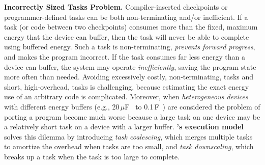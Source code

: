 \textbf{Incorrectly Sized Tasks Problem.} Compiler-inserted checkpoints or
programmer-defined tasks can be both non-terminating and/or
inefficient.  If a task (or code between two checkpoints) consumes more than the fixed,
maximum energy that the device can buffer, then the task
will never be able to complete using buffered energy.  Such a task is
non-terminating, {\em prevents forward progress}, and makes the program
incorrect. 
%
If the task consumes far less energy than a device can buffer, the system
may operate {\em inefficiently}, saving the program state more often than needed.
%
Avoiding excessively costly, non-terminating, tasks and short, high-overhead,
tasks is challenging, because estimating the exact energy use of an arbitrary code is complicated.  
Moreover, when \emph{heterogeneous devices} with different energy buffers (e.g., 20\,$\mu $F~\cite{rodriguez_tbcs_2015} to 0.1\,F~\cite{moo}) are considered the problem of porting a program become much worse
because a large task on one device may be a relatively short task
on a device with a larger buffer.
%
\textbf{\sys's execution model} solves this dilemma by introducing {\em task coalescing}, which
merges multiple tasks to amortize the overhead when tasks are too small, and
{\em task downscaling}, which breaks up a task when the task is too large to complete. 
